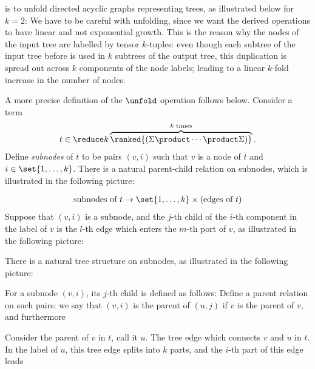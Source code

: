 is to unfold directed acyclic graphs representing trees, as illustrated below for $k=2$:
We have to be careful with unfolding, since we want the derived  operations to have linear and not exponential growth. This is the reason why the nodes of the input tree are labelled by tensor $k$-tuples:  even though each subtree of the input tree before is used in  $k$ subtrees of the output tree, this duplication is spread out across $k$ components of the node labels; leading to a linear $k$-fold increase in the number of nodes. 

A more precise definition of the $\unfold$ operation follows below. Consider a term 
\begin{align*}
    t \in \reduce k \overbrace{\ranked{(\Sigma \product \cdots \product \Sigma)}}^\text{$k$ times}.
\end{align*}
Define \emph{subnodes} of $t$ to be pairs  $(v,i)$ such that $v$ is a node of $t$ and $i \in \set{1,\ldots,k}$. There is a natural parent-child relation on subnodes, which is illustrated in the following picture:



\begin{align*}
    \text{subnodes of $t$} \to \set{1,\ldots,k} \times \text{(edges of $t$)}
\end{align*}
Suppose that $(v,i)$ is a subnode, and the $j$-th child of the $i$-th component in the label of $v$ is the $l$-th edge which enters the $m$-th port of $v$, as illustrated in the following picture:


There is a natural tree structure on subnodes, as illustrated in the following picture:

For a subnode $(v,i)$, its $j$-th child is defined as follows: Define a parent relation on such pairs: we say that $(v,i)$ is the parent of $(u,j)$ if $v$ is the parent of $v$, and furthermore 

Consider the parent of $v$ in $t$, call it $u$. The tree edge which connects $v$ and $u$ in $t$. In the label of $u$, this tree edge splits into $k$ parts, and the $i$-th part of this edge leads 



